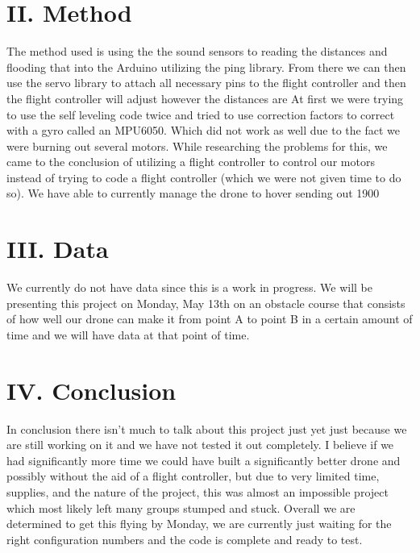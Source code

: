 \documentclass[aps,prl,twocolumn,showpacs,superscriptaddress,groupedaddress]{revtex4}  %
\begin{document}
\section{\label{sec: level2}II. Method}
The method used is using the the sound sensors to reading the distances and flooding that into the Arduino utilizing the ping library. From there we can then use the servo library to attach all necessary pins to the flight controller and then the flight controller will adjust however the distances are  At first we were trying to use the self leveling code twice and tried to use correction factors to correct with a gyro called an MPU6050. Which did not work as well due to the fact we were burning out several motors. While researching the problems for this, we came to the conclusion of utilizing a flight controller to control our motors instead of trying to code a flight controller (which we were not given time to do so). We have able to currently manage the drone to hover sending out 1900 



\section{\label{sec: level3}III. Data}
We currently do not have data since this is a work in progress. We will be presenting this project on Monday, May 13th on an obstacle  course that consists of how well our drone can make it from point A to point B in a certain amount of time and we will have data at that point of time. 

\section{\label{sec: level4}IV. Conclusion}
In conclusion there isn't much to talk about this project just yet just because we are still working on it and we have not tested it out completely. I believe if we had significantly more time we could have built a significantly better drone and possibly without the aid of a flight controller, but due to very limited time, supplies, and the nature of the project, this was almost an impossible project which most likely left many groups stumped and stuck. Overall we are determined to get this flying by Monday, we are currently just waiting for the right configuration numbers and the code is complete and ready to test. 
\end{document}
